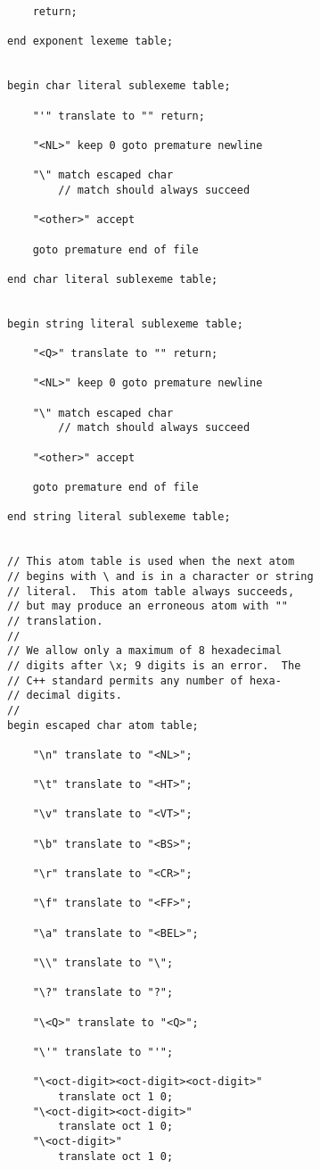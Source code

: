 \documentclass[12pt]{article}
\newenvironment{indpar}[1][0.3in]%
	{\begin{list}{}%
		     {\setlength{\itemsep}{0in}%
		      \setlength{\topsep}{0in}%
		      \setlength{\parsep}{1ex}%
		      \setlength{\labelwidth}{#1}%
		      \setlength{\leftmargin}{#1}%
		      \addtolength{\leftmargin}{\labelsep}}%
	 \item}%
	{\end{list}}
\begin{document}
\begin{indpar}
\begin{verbatim}
    return;

end exponent lexeme table;


begin char literal sublexeme table;

    "'" translate to "" return;

    "<NL>" keep 0 goto premature newline

    "\" match escaped char
        // match should always succeed

    "<other>" accept

    goto premature end of file

end char literal sublexeme table;


begin string literal sublexeme table;

    "<Q>" translate to "" return;

    "<NL>" keep 0 goto premature newline

    "\" match escaped char
        // match should always succeed

    "<other>" accept

    goto premature end of file

end string literal sublexeme table;


// This atom table is used when the next atom
// begins with \ and is in a character or string
// literal.  This atom table always succeeds,
// but may produce an erroneous atom with ""
// translation.
//
// We allow only a maximum of 8 hexadecimal
// digits after \x; 9 digits is an error.  The
// C++ standard permits any number of hexa-
// decimal digits.
//
begin escaped char atom table;

    "\n" translate to "<NL>";

    "\t" translate to "<HT>";

    "\v" translate to "<VT>";

    "\b" translate to "<BS>";

    "\r" translate to "<CR>";

    "\f" translate to "<FF>";

    "\a" translate to "<BEL>";

    "\\" translate to "\";

    "\?" translate to "?";

    "\<Q>" translate to "<Q>";

    "\'" translate to "'";

    "\<oct-digit><oct-digit><oct-digit>"
        translate oct 1 0;
    "\<oct-digit><oct-digit>"
        translate oct 1 0;
    "\<oct-digit>"
        translate oct 1 0;


\end{verbatim}
\end{indpar}
\end{document}
